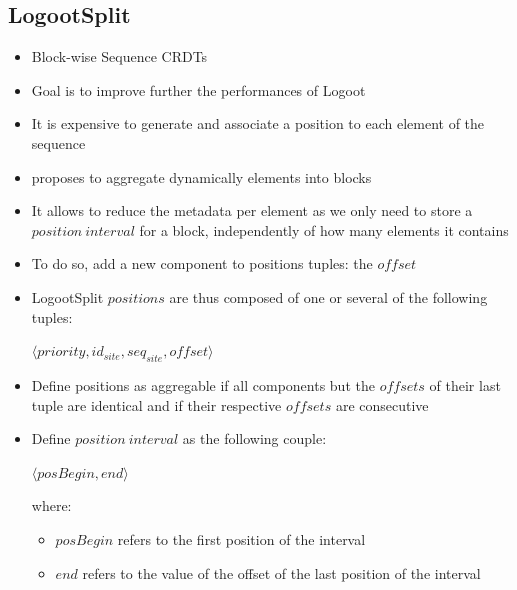 \documentclass{article}
\newcommand{\tuple}[1]{\langle #1 \rangle}
\theoremstyle{definition}
\begin{document}
\subsection{LogootSplit \cite{AndreCollaborateCom2013}}

\begin{itemize}
    \item Block-wise Sequence \acp{CRDT}
    \item Goal is to improve further the performances of Logoot
    \item It is expensive to generate and associate a position to each element of the sequence
    \item \textcite{AndreCollaborateCom2013} proposes to aggregate dynamically elements into blocks
    \item It allows to reduce the metadata per element as we only need to store a $position \ interval$ for a block, independently of how many elements it contains
    \item To do so, add a new component to positions tuples: the $offset$ 
    \item LogootSplit $positions$ are thus composed of one or several of the following tuples:

    \begin{center}
        $\tuple{priority, id_{site}, seq_{site}, offset}$
    \end{center}

    \item Define positions as aggregable if all components but the $offsets$ of their last tuple are identical and if their respective $offsets$ are consecutive
    \item Define $position \ interval$ as the following couple:

    \begin{center}
        $\tuple{posBegin, end}$
    \end{center}

    where:

    \begin{itemize}
        \item $posBegin$ refers to the first position of the interval
        \item $end$ refers to the value of the offset of the last position of the interval
    \end{itemize}


\end{itemize}
\end{document}
